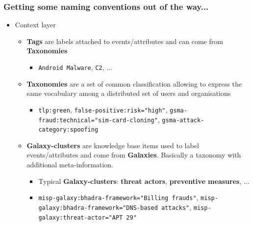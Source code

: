 \begin{frame}
    \frametitle{Getting some naming conventions out of the way...}
     \begin{itemize}
            \item Context layer
            \begin{itemize}
                \item {\bf Tags} are labels attached to events/attributes and can come from {\bf Taxonomies}
                \begin{itemize}
                    \item \texttt{Android Malware}, \texttt{C2}, ...
                \end{itemize}

                \item {\bf Taxonomies} are a set of common classification allowing to express the same vocabulary among a distributed set of users and organisations 
                \begin{itemize}
                    \item \texttt{tlp:green}, \texttt{false-positive:risk="high"}, \texttt{gsma-fraud:technical="sim-card-cloning"}, \texttt{gsma-attack-category:spoofing}
                \end{itemize}

                \item {\bf Galaxy-clusters} are knowledge base items used to label events/attributes and come from {\bf Galaxies}. Basically a taxonomy with additional meta-information.
                \begin{itemize}
                    \item Typical {\bf Galaxy-clusters}: {\bf threat actors}, {\bf preventive measures}, ...
                    \item \texttt{misp-galaxy:bhadra-framework="Billing frauds"}, \texttt{misp-galaxy:bhadra-framework="DNS-based attacks"}, \texttt{misp-galaxy:threat-actor="APT 29"}
                \end{itemize}
            \end{itemize}
    \end{itemize}
\end{frame}

